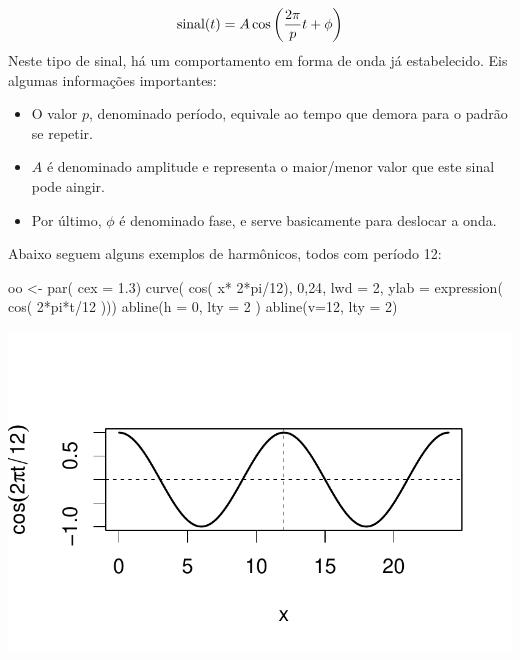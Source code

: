 \documentclass[
  letterpaper,
  DIV=11,
  numbers=noendperiod]{scrreprt}
\newenvironment{Shaded}{\begin{snugshade}}{\end{snugshade}}
\newcommand{\AttributeTok}[1]{\textcolor[rgb]{0.40,0.45,0.13}{#1}}
\newcommand{\DecValTok}[1]{\textcolor[rgb]{0.68,0.00,0.00}{#1}}
\newcommand{\FloatTok}[1]{\textcolor[rgb]{0.68,0.00,0.00}{#1}}
\newcommand{\FunctionTok}[1]{\textcolor[rgb]{0.28,0.35,0.67}{#1}}
\newcommand{\NormalTok}[1]{\textcolor[rgb]{0.00,0.23,0.31}{#1}}
\newcommand{\OtherTok}[1]{\textcolor[rgb]{0.00,0.23,0.31}{#1}}
\newcommand{\SpecialCharTok}[1]{\textcolor[rgb]{0.37,0.37,0.37}{#1}}
\begin{document}
\[\hbox{sinal}(t)=A\cos\left(\frac{2\pi}{p}t + \phi\right)\] Neste tipo
de sinal, há um comportamento em forma de onda já estabelecido. Eis
algumas informações importantes:

\begin{itemize}
\item
  O valor \(p\), denominado período, equivale ao tempo que demora para o
  padrão se repetir.
\item
  \(A\) é denominado amplitude e representa o maior/menor valor que este
  sinal pode aingir.
\item
  Por último, \(\phi\) é denominado fase, e serve basicamente para
  deslocar a onda.
\end{itemize}

Abaixo seguem alguns exemplos de harmônicos, todos com período 12:

\begin{Shaded}
\begin{Highlighting}[]
\NormalTok{oo }\OtherTok{\textless{}{-}} \FunctionTok{par}\NormalTok{( }\AttributeTok{cex =} \FloatTok{1.3}\NormalTok{)}
\FunctionTok{curve}\NormalTok{( }\FunctionTok{cos}\NormalTok{( x}\SpecialCharTok{*} \DecValTok{2}\SpecialCharTok{*}\NormalTok{pi}\SpecialCharTok{/}\DecValTok{12}\NormalTok{), }\DecValTok{0}\NormalTok{,}\DecValTok{24}\NormalTok{, }\AttributeTok{lwd =} \DecValTok{2}\NormalTok{, }\AttributeTok{ylab =} \FunctionTok{expression}\NormalTok{( }\FunctionTok{cos}\NormalTok{( }\DecValTok{2}\SpecialCharTok{*}\NormalTok{pi}\SpecialCharTok{*}\NormalTok{t}\SpecialCharTok{/}\DecValTok{12}\NormalTok{ )))}
\FunctionTok{abline}\NormalTok{(}\AttributeTok{h =} \DecValTok{0}\NormalTok{, }\AttributeTok{lty =} \DecValTok{2}\NormalTok{ )}
\FunctionTok{abline}\NormalTok{(}\AttributeTok{v=}\DecValTok{12}\NormalTok{, }\AttributeTok{lty =} \DecValTok{2}\NormalTok{)}
\end{Highlighting}
\end{Shaded}

\includegraphics{sinal_files/figure-pdf/unnamed-chunk-8-1.pdf}
\end{document}
